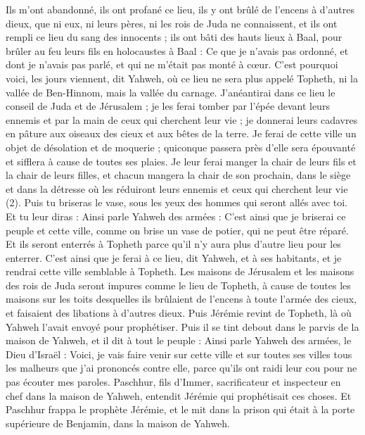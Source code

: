 \begin{multicols}{2}
Ils m'ont abandonné, ils ont profané ce lieu, ils y ont brûlé de l’encens à d'autres dieux, que ni eux, ni leurs pères, ni les rois de Juda ne connaissent, et ils ont rempli ce lieu du sang des innocents ;
ils ont bâti des hauts lieux à Baal, pour brûler au feu leurs fils en holocaustes à Baal : Ce que je n'avais pas ordonné, et dont je n'avais pas parlé, et qui ne m’était pas monté à cœur.
C’est pourquoi voici, les jours viennent, dit Yahweh, où ce lieu ne sera plus appelé Topheth, ni la vallée de Ben-Hinnom, mais la vallée du carnage.
J’anéantirai dans ce lieu le conseil de Juda et de Jérusalem ; je les ferai tomber par l'épée devant leurs ennemis et par la main de ceux qui cherchent leur vie ; je donnerai leurs cadavres en pâture aux oiseaux des cieux et aux bêtes de la terre.
Je ferai de cette ville un objet de désolation et de moquerie ; quiconque passera près d'elle sera épouvanté et sifflera à cause de toutes ses plaies.
Je leur ferai manger la chair de leurs fils et la chair de leurs filles, et chacun mangera la chair de son prochain, dans le siège et dans la détresse où les réduiront leurs ennemis et ceux qui cherchent leur vie\FTNT{} (2).
Puis tu briseras le vase, sous les yeux des hommes qui seront allés avec toi.
Et tu leur diras : Ainsi parle Yahweh des armées : C’est ainsi que je briserai ce peuple et cette ville, comme on brise un vase de potier, qui ne peut être réparé. Et ils seront enterrés à Topheth parce qu'il n'y aura plus d'autre lieu pour les enterrer.
C’est ainsi que je ferai à ce lieu, dit Yahweh, et à ses habitants, et je rendrai cette ville semblable à Topheth.
Les maisons de Jérusalem et les maisons des rois de Juda seront impures comme le lieu de Topheth, à cause de toutes les maisons sur les toits desquelles ils brûlaient de l’encens à toute l'armée des cieux, et faisaient des libations à d'autres dieux.
Puis Jérémie revint de Topheth, là où Yahweh l'avait envoyé pour prophétiser. Puis il se tint debout dans le parvis de la maison de Yahweh, et il dit à tout le peuple :
Ainsi parle Yahweh des armées, le Dieu d'Israël : Voici, je vais faire venir sur cette ville et sur toutes ses villes tous les malheurs que j'ai prononcés contre elle, parce qu'ils ont raidi leur cou pour ne pas écouter mes paroles.
\VerseOne{}Paschhur, fils d'Immer, sacrificateur et inspecteur en chef dans la maison de Yahweh, entendit Jérémie qui prophétisait ces choses.
Et Paschhur frappa le prophète Jérémie, et le mit dans la prison qui était à la porte supérieure de Benjamin, dans la maison de Yahweh.

\end{multicols}
